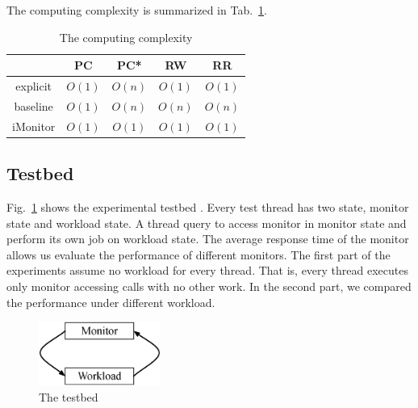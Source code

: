 \documentclass[preprint]{sigplanconf}
\begin{document}
The computing complexity is summarized in Tab.~\ref{tab:complexity}.
\begin{table}
   \centering
   \begin{tabular}{|c||c|c|c|c|}
      \hline 
         & PC & PC* & RW & RR \\
      \hline 
      explicit & $O(1)$ & $O(n)$ & $O(1)$ & $O(1)$ \\
      \hline 
      baseline & $O(1)$ & $O(n)$ & $O(n)$ & $O(n)$ \\
      \hline 
      iMonitor & $O(1)$ & $O(1)$ & $O(1)$ & $O(1)$ \\
      \hline 
   \end{tabular}
   \caption{The computing complexity}
   \label{tab:complexity}
\end{table}



\subsection{Testbed}
Fig.~\ref{fig:testbed} shows the experimental testbed \cite{bfc95}. 
Every test thread has two state, monitor state and workload state. A thread
query to access monitor in monitor state and perform its own job on workload
state. The average response time of the monitor allows us evaluate the
performance of different monitors. The first part of the experiments assume
no workload for every thread. That is, every thread executes only monitor
accessing calls with no other work. In the second part, we compared the
performance under different workload.  
\begin{figure}[ht!]
  \centering
  \includegraphics[width=40mm]{fig/testbed.eps}
  \caption{The testbed}
  \label{fig:testbed}
\end{figure}
\end{document}
